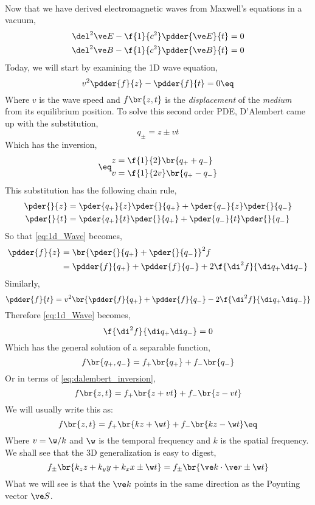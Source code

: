 \documentclass{article}
\begin{document}
\\

Now that we have derived electromagnetic waves from Maxwell's equations in a vacuum,
\begin{align*}
\del^2 \ve E - \f{1}{c^2} \pdder{\ve E}{t} &= 0 \\
\del^2 \ve B - \f{1}{c^2} \pdder{\ve B}{t} &= 0
\end{align*}
Today, we will start by examining the 1D wave equation,
\[ v^2 \pdder{f}{z} - \pdder{f}{t} = 0 \eq \label{eq:1d_Wave}\]
Where $v$ is the wave speed and $f\br{z,t}$ is the \textit{displacement} of the \textit{medium} from its equilibrium position. To solve this second order PDE, D'Alembert came up with the substitution,
\[ q_{\pm} = z \pm v t \]
Which has the inversion,
\begin{align*}
\eq \label{eq:dalembert_inversion}
\begin{split}
z &= \f{1}{2}\br{q_{+} + q_{-}} \\
v &= \f{1}{2v}\br{q_{+} - q_{-}}
\end{split}
\end{align*}
This substitution has the following chain rule,
\begin{align*}
    \pder{}{z} &= \pder{q_{+}}{z}\pder{}{q_{+}} + \pder{q_{-}}{z}\pder{}{q_{-}}\\
    \pder{}{t} &= \pder{q_{+}}{t}\pder{}{q_{+}} + \pder{q_{-}}{t}\pder{}{q_{-}}
\end{align*}
So that \cref{eq:1d_Wave} becomes,
\begin{align*}
\pdder{f}{z}
&= \br{\pder{}{q_{+}} + \pder{}{q_{-}}}^2 f \\
&= \pdder{f}{q_{+}} + \pdder{f}{q_{-}} + 2 \f{\di^2 f}{\di q_{+} \di q_-}
\end{align*}
Similarly,
\[ \pdder{f}{t} = v^2\br{\pdder{f}{q_{+}} + \pdder{f}{q_{-}} - 2 \f{\di^2 f}{\di q_{+} \di q_-}} \]
Therefore \cref{eq:1d_Wave} becomes,
\[ \f{\di^2 f}{\di q_{+} \di q_-} = 0 \]
Which has the general solution of a separable function,
\[ f\br{q_+, q_-}= f_+\br{q_+} + f_-\br{q_-} \]
Or in terms of \cref{eq:dalembert_inversion},
\[ f\br{z, t}= f_+\br{z+vt} + f_-\br{z-vt} \]
We will usually write this as:
\[ f\br{z, t}= f_+\br{kz+\w t} + f_-\br{kz-\w t} \eq \label{eq:dalembert_solution} \]
Where $v = \w /k$ and $\w$ is the temporal frequency and $k$ is the spatial frequency. We shall see that the 3D generalization is easy to digest,
\[ f_{\pm}\br{k_z z + k_y y + k_x x \pm \w t} = f_{\pm}\br{\ve k \cdot \ve r \pm \w t} \]
What we will see is that the  $\ve k$ points in the same direction as the Poynting vector $\ve S$. \\
\end{document}

